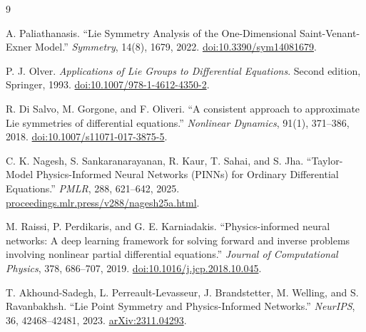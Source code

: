 \documentclass[12pt,a4paper]{article}
\begin{document}
\newpage
\begin{thebibliography}{9}
\raggedright
\setlength{\itemsep}{3pt}
\setlength{\parskip}{0pt}
A. Paliathanasis. ``Lie Symmetry Analysis of the One-Dimensional Saint-Venant-Exner Model.'' \emph{Symmetry}, 14(8), 1679, 2022.
\href{https://doi.org/10.3390/sym14081679}{doi:10.3390/sym14081679}.

P. J. Olver. \emph{Applications of Lie Groups to Differential Equations}. Second edition, Springer, 1993.
\href{https://doi.org/10.1007/978-1-4612-4350-2}{doi:10.1007/978-1-4612-4350-2}.

R. Di Salvo, M. Gorgone, and F. Oliveri. ``A consistent approach to approximate Lie symmetries of differential equations.'' \emph{Nonlinear Dynamics}, 91(1), 371--386, 2018.
\href{https://doi.org/10.1007/s11071-017-3875-5}{doi:10.1007/s11071-017-3875-5}.

C. K. Nagesh, S. Sankaranarayanan, R. Kaur, T. Sahai, and S. Jha. ``Taylor-Model Physics-Informed Neural Networks (PINNs) for Ordinary Differential Equations.'' \emph{PMLR}, 288, 621--642, 2025.
\href{https://proceedings.mlr.press/v288/nagesh25a.html}{proceedings.mlr.press/v288/nagesh25a.html}.

M. Raissi, P. Perdikaris, and G. E. Karniadakis. ``Physics-informed neural networks: A deep learning framework for solving forward and inverse problems involving nonlinear partial differential equations.'' \emph{Journal of Computational Physics}, 378, 686--707, 2019.
\href{https://doi.org/10.1016/j.jcp.2018.10.045}{doi:10.1016/j.jcp.2018.10.045}.

T. Akhound-Sadegh, L. Perreault-Levasseur, J. Brandstetter, M. Welling, and S. Ravanbakhsh. ``Lie Point Symmetry and Physics-Informed Networks.'' \emph{NeurIPS}, 36, 42468--42481, 2023.
\href{https://arxiv.org/abs/2311.04293}{arXiv:2311.04293}.
\end{thebibliography}
\end{document}

